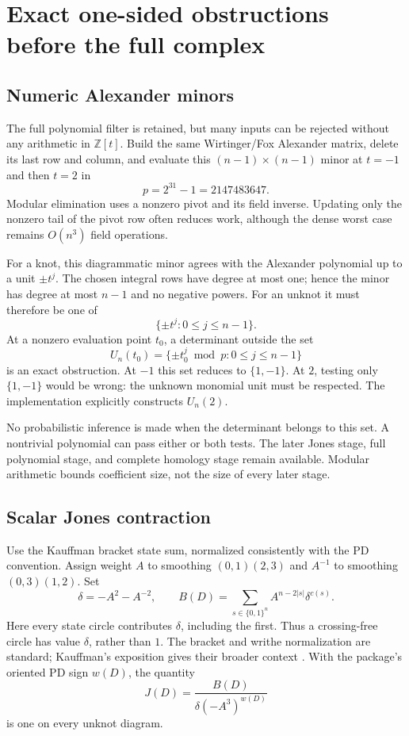 \documentclass[11pt]{article}
\begin{document}
\section{Exact one-sided obstructions before the full complex}

\subsection{Numeric Alexander minors}

The full polynomial filter is retained, but many inputs can be rejected
without any arithmetic in $\mathbb Z[t]$. Build the same Wirtinger/Fox
Alexander matrix, delete its last row and column, and evaluate this
$(n-1)\times(n-1)$ minor at $t=-1$ and then $t=2$ in
\[
 p=2^{31}-1=2147483647.
\]
Modular elimination uses a nonzero pivot and its field inverse. Updating only
the nonzero tail of the pivot row often reduces work, although the dense worst
case remains $O(n^3)$ field operations.

For a knot, this diagrammatic minor agrees with the Alexander polynomial up
to a unit $\pm t^j$. The chosen integral rows have degree at most one; hence
the minor has degree at most $n-1$ and no negative powers. For an unknot it must
therefore be one of
\[
 \{\pm t^j:0\leq j\leq n-1\}.
\]
At a nonzero evaluation point $t_0$, a determinant outside the set
\[
 U_n(t_0)=\{\pm t_0^j\bmod p:0\leq j\leq n-1\}
\]
is an exact obstruction. At $-1$ this set reduces to $\{1,-1\}$.
At $2$, testing only $\{1,-1\}$ would be wrong: the unknown monomial unit must
be respected. The implementation explicitly constructs $U_n(2)$.

No probabilistic inference is made when the determinant belongs to this set.
A nontrivial polynomial can pass either or both tests. The later Jones stage,
full polynomial stage, and complete homology stage remain available. Modular
arithmetic bounds coefficient size, not the size of every later stage.

\subsection{Scalar Jones contraction}

Use the Kauffman bracket state sum, normalized consistently with the PD
convention. Assign weight $A$ to smoothing $(0,1)(2,3)$ and $A^{-1}$ to
smoothing $(0,3)(1,2)$. Set
\[
 \delta=-A^2-A^{-2},\qquad
 B(D)=\sum_{s\in\{0,1\}^n}A^{n-2|s|}\delta^{c(s)}.
\]
Here every state circle contributes $\delta$, including the first. Thus a
crossing-free circle has value $\delta$, rather than $1$. The bracket and writhe
normalization are standard; Kauffman's exposition gives their broader context
\cite{kauffman}. With the package's oriented PD sign $w(D)$, the quantity
\[
 J(D)=\frac{B(D)}{\delta(-A^3)^{w(D)}}
\]
is one on every unknot diagram.
\end{document}
